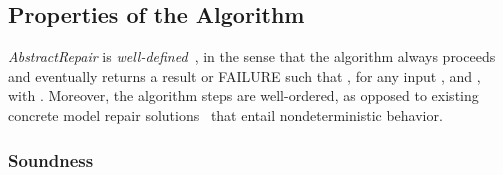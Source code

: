 \subsection{Properties of the Algorithm}
\label{subsec:alg_props}
\emph{AbstractRepair} is \emph{well-defined}~\cite{BGS07}, in the 
sense that the algorithm always proceeds and eventually returns a result  or FAILURE such that , for any input ,  and , with .  Moreover, the algorithm steps are well-ordered, as opposed to existing concrete model repair solutions~\cite{CR11,ZD08} that entail nondeterministic behavior.  

\subsubsection{Soundness}
\label{subsubsec:alg_soundness}

